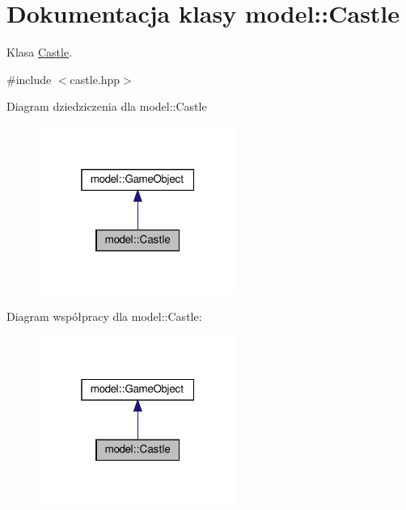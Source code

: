 \hypertarget{classmodel_1_1Castle}{}\section{Dokumentacja klasy model\+:\+:Castle}
\label{classmodel_1_1Castle}


Klasa \hyperlink{classmodel_1_1Castle}{Castle}.  




{\ttfamily \#include $<$castle.\+hpp$>$}



Diagram dziedziczenia dla model\+:\+:Castle\nopagebreak
\begin{figure}[H]
\begin{center}
\leavevmode
\includegraphics[width=184pt]{classmodel_1_1Castle__inherit__graph}
\end{center}
\end{figure}


Diagram współpracy dla model\+:\+:Castle\+:\nopagebreak
\begin{figure}[H]
\begin{center}
\leavevmode
\includegraphics[width=184pt]{classmodel_1_1Castle__coll__graph}
\end{center}
\end{figure}
